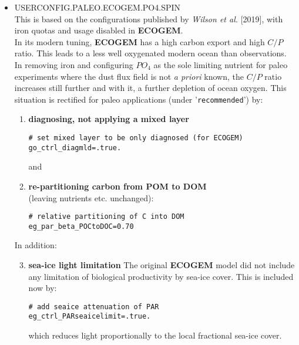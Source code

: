 \documentclass[11pt,fleqn]{book} %
\begin{document}
\begin{itemize}[noitemsep]
\vspace{2mm}
\item \textsf{\footnotesize USERCONFIG.PALEO.ECOGEM.PO4.SPIN}
\vspace{1mm}
\\This is based on the configurations published by \textit{Wilson et al.} [2019], with iron quotas and usage disabled in \textbf{ECOGEM}.
\\In its modern tuning, \textbf{ECOGEM} has a high carbon export and high \(C/P\) ratio. This leads to a less well oxygenated modern ocean than observations. In removing iron and configuring \(PO_{4}\) as the sole limiting nutrient for paleo experiments where the dust flux field is not \textit{a priori} known, the \(C/P\) ratio increases still further and with it, a further depletion of ocean oxygen. This situation is rectified for paleo applications (under '\texttt{recommended}') by:
\begin{enumerate}[noitemsep]
\vspace{1mm}
\item \textbf{diagnosing, not applying a mixed layer}
\small\vspace{-1mm}\begin{verbatim}
# set mixed layer to be only diagnosed (for ECOGEM)
go_ctrl_diagmld=.true.
\end{verbatim}\vspace{-1mm}\normalsize
and
\vspace{1mm}
\item \textbf{re-partitioning carbon from POM to DOM}
\\(leaving nutrients etc. unchanged):
\small\vspace{-1mm}\begin{verbatim}
# relative partitioning of C into DOM
eg_par_beta_POCtoDOC=0.70
\end{verbatim}\vspace{-1mm}\normalsize
\end{enumerate}
In addition:
\begin{enumerate}[noitemsep]
\setcounter{enumi}{2}
\vspace{1mm}
\item \textbf{sea-ice light limitation}
The original \textbf{ECOGEM} model did not include any limitation of biological productivity by sea-ice cover. This is included now by:
\small\vspace{-1mm}\begin{verbatim}
# add seaice attenuation of PAR
eg_ctrl_PARseaicelimit=.true.
\end{verbatim}\vspace{-1mm}\normalsize
which reduces light proportionally to the local fractional sea-ice cover.
\end{enumerate}
\end{itemize}
\end{document}
